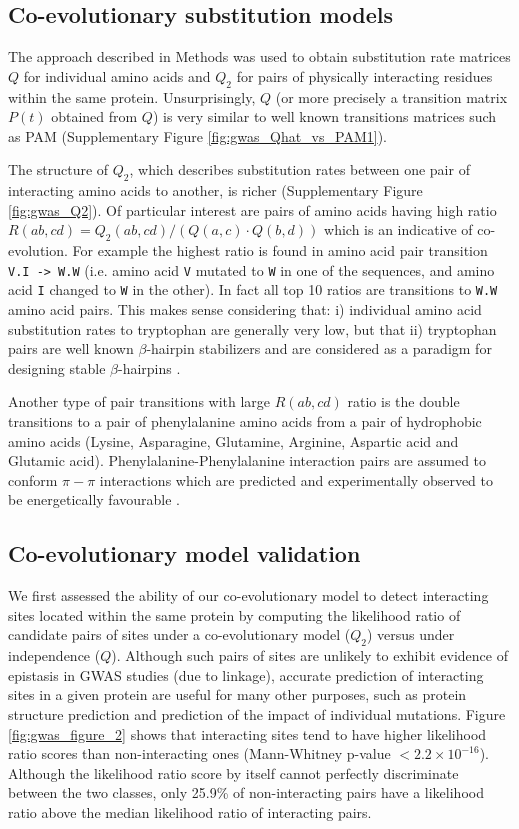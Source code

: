 \subsection{Co-evolutionary substitution models}

The approach described in Methods was used to obtain substitution rate matrices $Q$ for individual amino acids and $Q_2$ for pairs of physically interacting residues within the same protein. 
Unsurprisingly, $Q$ (or more precisely a transition matrix $P(t)$ obtained from $Q$) is very similar to well known transitions matrices such as PAM \cite{dayhoff1978model} (Supplementary Figure \ref{fig:gwas_Qhat_vs_PAM1}).

The structure of $Q_2$, which describes substitution rates between one pair of interacting amino acids to another, is richer (Supplementary Figure \ref{fig:gwas_Q2}). 
Of particular interest are pairs of amino acids having high ratio $R(ab,cd) = Q_2 (ab, cd) / ( Q(a,c) \cdot Q(b,d) )$ which is an indicative of co-evolution.
For example the highest ratio is found in amino acid pair transition \texttt{V.I -> W.W} (i.e. amino acid \texttt{V} mutated to \texttt{W} in one of the sequences, and amino acid \texttt{I} changed to \texttt{W} in the other). 
In fact all top 10 ratios are transitions to \texttt{W.W} amino acid pairs.
This makes sense considering that:
i) individual amino acid substitution rates to tryptophan are generally very low, but that 
ii) tryptophan pairs are well known $\beta$-hairpin stabilizers and are considered as a paradigm for designing stable $\beta$-hairpins \cite{santiveri2010tryptophan}.

Another type of pair transitions with large $R(ab,cd)$ ratio is the double transitions to a pair of phenylalanine amino acids from a pair of hydrophobic amino acids (Lysine, Asparagine, Glutamine, Arginine, Aspartic acid and Glutamic acid). 
Phenylalanine-Phenylalanine interaction pairs are assumed to conform $\pi-\pi$ interactions which are predicted and experimentally observed to be energetically favourable \cite{hunter1991pi}.

\subsection{Co-evolutionary model validation}

We first assessed the ability of our co-evolutionary model to detect interacting sites located within the same protein by computing the likelihood ratio of candidate pairs of sites under a co-evolutionary model ($Q_2$) versus under independence ($Q$). 
Although such pairs of sites are unlikely to exhibit evidence of epistasis in GWAS studies (due to linkage), accurate prediction of interacting sites in a given protein are useful for many other purposes, such as protein structure prediction and prediction of the impact of individual mutations.  
Figure \ref{fig:gwas_figure_2} shows that interacting sites tend to have higher likelihood ratio scores than non-interacting ones (Mann-Whitney p-value $< 2.2 \times 10^{-16}$). 
Although the likelihood ratio score by itself cannot perfectly discriminate between the two classes, only 25.9\% of non-interacting pairs have a likelihood ratio above the median likelihood ratio of interacting pairs. 

